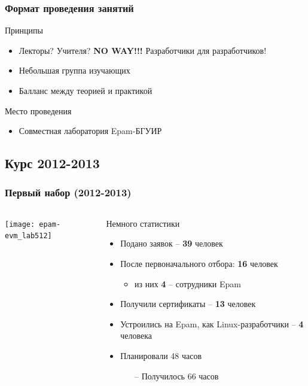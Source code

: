 \begin{frame}
	\frametitle{Формат проведения занятий}

	\begin{block}{Принципы}
		\begin{itemize}
			\item Лекторы? Учителя? {\bf NO WAY!!!} \newline 
				Разработчики для разработчиков! 
			\item Небольшая группа изучающих
			\item Балланс между теорией и практикой
		\end{itemize}
	\end{block}

	\begin{block}{Место проведения}
		\begin{itemize}
			\item Совместная лаборатория Epam-БГУИР 
		\end{itemize}
	\end{block}

\end{frame}

\subsection[2012]{Курс 2012-2013}

\begin{frame}
  \frametitle{Первый набор (2012-2013)}
  \begin{columns}
	\texttt{[image: epam-evm\_lab512]}

	\begin{block}{Немного статистики}
		\begin{itemize}
			\item Подано заявок -- {\bf 39} человек
			\item После первоначального отбора: {\bf 16} человек
				\begin{itemize}
					\item из них {\bf 4} -- сотрудники Epam
				\end{itemize}
			\item Получили сертификаты -- {\bf 13} человек
			\item Устроились на Epam, как Linux-разработчики -- {\bf 4} человека
            \item Планировали 48 часов
            \pause
			\begin{itemize}
    				\item[--] Получилось 66 часов
			\end{itemize}
		\end{itemize}
	\end{block}
  \end{columns}
\end{frame}

